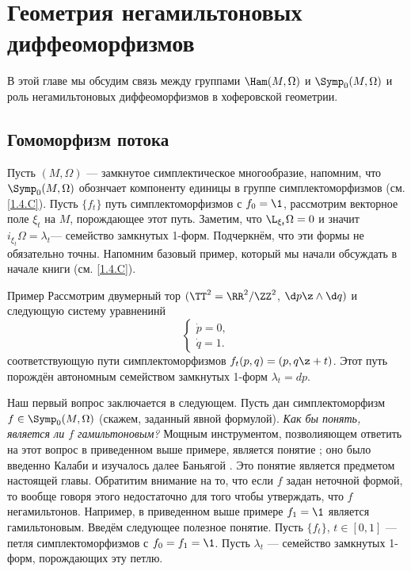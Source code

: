 \chapter[Негамильтоновы диффеоморфизмы]{Геометрия негамильтоновых диффеоморфизмов}\label{chap:14}

В этой главе мы обсудим связь между группами $\Ham(M,\Omega)$ и $\Symp_0(M,\Omega)$ и роль негамильтоновых диффеоморфизмов в хоферовской геометрии.

\section{Гомоморфизм потока}\label{sec:14.1}

Пусть $(M,\Omega)$ --- замкнутое симплектическое многообразие, напомним, что $\Symp_0(M,\Omega)$ обознчает компоненту единицы в группе симплектоморфизмов (см. \ref{1.4.C}).
Пусть $\{f_t\}$  путь симплектоморфизмов с $f_0 = \1$,
рассмотрим векторное поле $\xi_t$ на $M$, порождающее этот путь.
Заметим, что $\L_{\xi_t}\Omega=0$ и значит  $i_{\xi_t}\Omega=\lambda_t$ ​​--- семейство замкнутых 1-форм.
Подчеркнём, что эти формы не обязательно точны.
Напомним базовый пример, который мы начали обсуждать в начале книги (см. \ref{1.4.C}).


\begin{thm}{Пример}\label{14.1.A}
Рассмотрим двумерный тор $(\TT^2=\RR^2/\ZZ^2$, $\d p\z\wedge \d q)$ и следующую систему уравненинй
\[
\begin{cases}
\dot p=0,
\\
\dot q=1.
\end{cases}
\]
соответствующую пути симплектоморфизмов $f_t(p, q) = (p, q \z+ t)$.
Этот путь порождён автономным семейством замкнутых 1-форм $\lambda_t = dp$.
\end{thm}


Наш первый вопрос заключается в следующем.
Пусть дан симплектоморфизм $f\in\Symp_0(M,\Omega)$ (скажем, заданный явной формулой).
\textit{Как бы понять, является ли $f$ гамильтоновым?}
Мощным инструментом, позволияющем ответить на этот вопрос в приведенном выше примере, является понятие ; оно было введенно Калаби и изучалось далее Баньягой \cite{B1}.
Это понятие является предметом настоящей главы.
Обратитим внимание на то, что если $f$ задан неточной формой, то вообще говоря этого недостаточно для того чтобы утверждать, что $f$ негамильтонов.
Например, в приведенном выше примере $f_1 = \1$ является гамильтоновым.
Введём следующее полезное понятие.
Пусть $\{f_t\}$, $t\in[0,1]$ --- петля симплектоморфизмов с $f_0 = f_1 = \1$.
Пусть ${\lambda_t}$ --- семейство замкнутых 1-форм, порождающих эту петлю.

